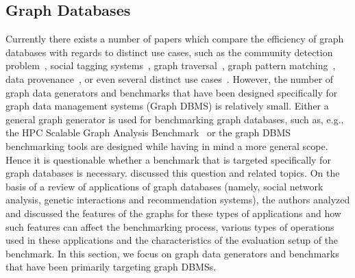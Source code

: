 \subsection{Graph Databases}
\label{sec:generators_GraphDatabases}

Currently there exists a number of papers which compare the efficiency of graph databases with regards to distinct use cases, such as  the community detection problem~\cite{Beis2015}, social tagging systems~\cite{Giatsoglou2011}, graph traversal~\cite{Ciglan:2012:BTO:2374486.2375242}, graph pattern matching~\cite{Pobiedina2014}, data provenance~\cite{Vicknair:2010:CGD:1900008.1900067}, or even several distinct use cases~\cite{Grossniklaus2013Towar-24253}. However, the number of graph data generators and benchmarks that have been designed specifically for graph data management systems (Graph DBMS)  is relatively small. Either a general graph generator is used for benchmarking graph databases, such as, e.g., the HPC Scalable Graph Analysis Benchmark~\cite{Dominguez-Sal:2010:SGD:1927585.1927590} or the graph DBMS benchmarking tools are designed while having in mind a more general scope. Hence it is questionable whether a benchmark  that is targeted specifically for graph databases is necessary. \cite{Dominguez-Sal:2010:DDG:1946050.1946053} discussed this question and related topics. On the basis of a review of applications of graph databases (namely, social network analysis,  genetic interactions and recommendation systems), the authors analyzed and discussed the features of the graphs for these types of applications and how such features can affect the benchmarking process, various types of operations used in these applications and the characteristics of the evaluation setup of the benchmark. In this section, we focus on graph data generators and benchmarks that have been primarily targeting graph DBMSs.


